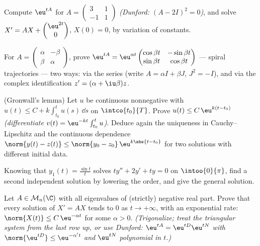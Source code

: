 \begin{exercise}[$\star\star$]\label{exo:b2:diffeq:4}
Compute $\eu^{tA}$ for $A = \begin{pmatrix} 3 & 1\\ -1 &
1\end{pmatrix}$ \emph{(Dunford: $(A - 2I)^2 = 0$)}, and solve $X' =
AX + \begin{pmatrix} \eu^{2t}\\ 0\end{pmatrix}$, $X(0) = 0$, by
variation of constants.
\end{exercise}

\begin{exercise}[$\star\star$]\label{exo:b2:diffeq:5}
For $A = \begin{pmatrix} \alpha & -\beta\\ \beta &
\alpha\end{pmatrix}$, prove $\eu^{tA} =
\eu^{\alpha t}\begin{pmatrix} \cos\beta t & -\sin\beta t\\
\sin\beta t & \cos\beta t\end{pmatrix}$ --- spiral trajectories ---
two ways: via the series (write $A = \alpha I + \beta J$, $J^2 =
-I$), and via the complex identification $z' = (\alpha +
\iu\beta)z$.
\end{exercise}

\begin{exercise}[$\star\star$]\label{exo:b2:diffeq:6}
(Gronwall's lemma) Let $u$ be continuous nonnegative with $u(t)
\leq C + k\int_{t_0}^{t} u(s)\,\dd s$ on $\intco{t_0}{T}$. Prove
$u(t) \leq C\,\eu^{k(t - t_0)}$ \emph{(differentiate $v(t) =
\eu^{-kt}\int_{t_0}^t u$)}. Deduce again the uniqueness in
Cauchy--Lipschitz and the continuous dependence $\norm{y(t) -
z(t)} \leq \norm{y_0 - z_0}\,\eu^{k\abs{t - t_0}}$ for two
solutions with different initial data.
\end{exercise}

\begin{exercise}[$\star\star$]\label{exo:b2:diffeq:7}
Knowing that $y_1(t) = \frac{\sin t}{t}$ solves $ty'' + 2y' + ty =
0$ on $\intoo{0}{\pi}$, find a second independent solution by
lowering the order, and give the general solution.
\end{exercise}

\begin{exercise}[$\star\star\star$]\label{exo:b2:diffeq:8}
Let $A \in \mathcal{M}_n(\C)$ with all eigenvalues of (strictly)
negative real part. Prove that every solution of $X' = AX$ tends to
$0$ as $t \to +\infty$, with an exponential rate: $\norm{X(t)}
\leq C\,\eu^{-\alpha t}$ for some $\alpha > 0$.
\emph{(Trigonalize; treat the triangular system from the last row
up, or use Dunford: $\eu^{tA} = \eu^{tD}\eu^{tN}$ with
$\norm{\eu^{tD}} \leq \eu^{-\alpha' t}$ and $\eu^{tN}$ polynomial
in $t$.)}
\end{exercise}

